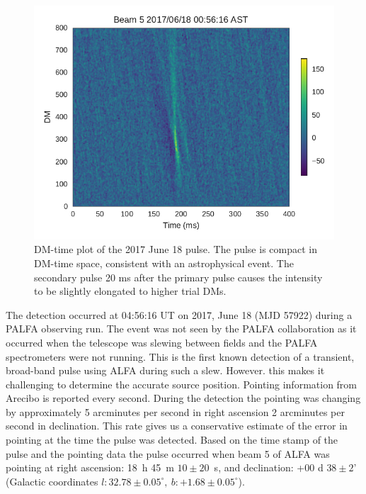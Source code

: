 \documentclass[a4paper,fleqn,usenatbib]{mnras}
\begin{document}
\begin{figure}
    \includegraphics[width=1.0\linewidth]{figures/Beam5_fb_D20170618T005616_buffer2_dmspace.pdf}
    \caption{DM-time plot of the 2017 June 18 pulse. The pulse is compact in
    DM-time space, consistent with an astrophysical event. The secondary pulse
    20 ms after the primary pulse causes the intensity to be slightly elongated
    to higher trial DMs.
    }
    \label{fig:D20170618_dmspace}
\end{figure}

The detection occurred at 04:56:16 UT on 2017, June 18 (MJD 57922) during a
PALFA observing run. The event was not seen by the PALFA collaboration as it
occurred when the telescope was slewing between fields and the PALFA
spectrometers were not running. This is the first known detection of a
transient, broad-band pulse using ALFA during such a slew. However. this makes
it challenging to determine the accurate source position. Pointing information
from Arecibo is reported every second.  During the detection the pointing was
changing by approximately 5 arcminutes per second in right ascension 2
arcminutes per second in declination. This rate gives us a conservative estimate
of the error in pointing at the time the pulse was detected. Based on the time
stamp of the pulse and the pointing data the pulse occurred when beam 5 of ALFA
was pointing at right ascension: 18~h 45~m $10 \pm 20$~s, and declination: +00 d
$38 \pm 2$' (Galactic coordinates $l: 32.78 \pm 0.05^{\circ}, ~b: +1.68 \pm
0.05^{\circ}$).
\end{document}
